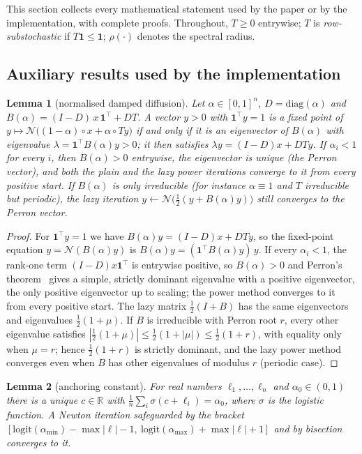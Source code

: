 \documentclass[11pt,a4paper]{article}
\newtheorem{lemma}{Lemma}
\theoremstyle{definition}
\theoremstyle{plain}
\newcommand{\diag}{\mathrm{diag}}
\newcommand{\N}{\mathcal{N}}
\newcommand{\one}{\mathbf{1}}
\begin{document}
This section collects every mathematical statement used by the paper or by the implementation, with complete proofs. Throughout, $T\ge0$ entrywise; $T$ is \emph{row-substochastic} if $T\one\le\one$; $\rho(\cdot)$ denotes the spectral radius.

\subsection{Auxiliary results used by the implementation}

\begin{lemma}[normalised damped diffusion]\label{lem:diffusion}
Let $\alpha\in[0,1]^n$, $D=\diag(\alpha)$ and $B(\alpha)=(I-D)\,x\,\one^{\top}+DT$. A vector $y>0$ with $\one^{\top}y=1$ is a fixed point of $y\mapsto\N\big((1-\alpha)\circ x+\alpha\circ Ty\big)$ if and only if it is an eigenvector of $B(\alpha)$ with eigenvalue $\lambda=\one^{\top}B(\alpha)y>0$; it then satisfies $\lambda y=(I-D)x+DTy$. If $\alpha_i<1$ for every $i$, then $B(\alpha)>0$ entrywise, the eigenvector is unique (the Perron vector), and both the plain and the lazy power iterations converge to it from every positive start. If $B(\alpha)$ is only irreducible (for instance $\alpha\equiv1$ and $T$ irreducible but periodic), the lazy iteration $y\leftarrow\N\big(\tfrac12(y+B(\alpha)y)\big)$ still converges to the Perron vector.
\end{lemma}

\begin{proof}
For $\one^{\top}y=1$ we have $B(\alpha)y=(I-D)x+DTy$, so the fixed-point equation $y=\N(B(\alpha)y)$ is $B(\alpha)y=(\one^{\top}B(\alpha)y)\,y$. If every $\alpha_i<1$, the rank-one term $(I-D)x\one^{\top}$ is entrywise positive, so $B(\alpha)>0$ and Perron's theorem~\cite{hornjohnson13} gives a simple, strictly dominant eigenvalue with a positive eigenvector, the only positive eigenvector up to scaling; the power method converges to it from every positive start. The lazy matrix $\tfrac12(I+B)$ has the same eigenvectors and eigenvalues $\tfrac12(1+\mu)$. If $B$ is irreducible with Perron root $r$, every other eigenvalue satisfies $|\tfrac12(1+\mu)|\le\tfrac12(1+|\mu|)\le\tfrac12(1+r)$, with equality only when $\mu=r$; hence $\tfrac12(1+r)$ is strictly dominant, and the lazy power method converges even when $B$ has other eigenvalues of modulus $r$ (periodic case).
\end{proof}

\begin{lemma}[anchoring constant]\label{lem:anchor}
For real numbers $\ell_1,\dots,\ell_n$ and $\alpha_0\in(0,1)$ there is a unique $c\in\mathbb R$ with $\frac1n\sum_i\sigma(c+\ell_i)=\alpha_0$, where $\sigma$ is the logistic function. A Newton iteration safeguarded by the bracket $[\mathrm{logit}(\alpha_{\min})-\max|\ell|-1,\ \mathrm{logit}(\alpha_{\max})+\max|\ell|+1]$ and by bisection converges to it.
\end{lemma}
\end{document}
